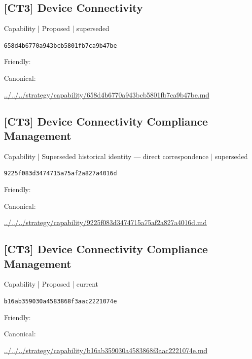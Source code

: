 \documentclass[10pt,a4paper]{article}
\begin{document}
\subsection*{[CT3] Device Connectivity}
{\small Capability | Proposed | superseded}\par
\texttt{658d4b6770a943bcb5801fb7ca9b47be}\par
Friendly: \par
Canonical: \par
{\footnotesize\url{../../../strategy/capability/658d4b6770a943bcb5801fb7ca9b47be.md}}\par
\subsection*{[CT3] Device Connectivity Compliance Management}
{\small Capability | Superseded historical identity — direct correspondence | superseded}\par
\texttt{9225f083d3474715a75af2a827a4016d}\par
Friendly: \par
Canonical: \par
{\footnotesize\url{../../../strategy/capability/9225f083d3474715a75af2a827a4016d.md}}\par
\subsection*{[CT3] Device Connectivity Compliance Management}
{\small Capability | Proposed | current}\par
\texttt{b16ab359030a4583868f3aac2221074e}\par
Friendly: \par
Canonical: \par
{\footnotesize\url{../../../strategy/capability/b16ab359030a4583868f3aac2221074e.md}}\par
\end{document}
